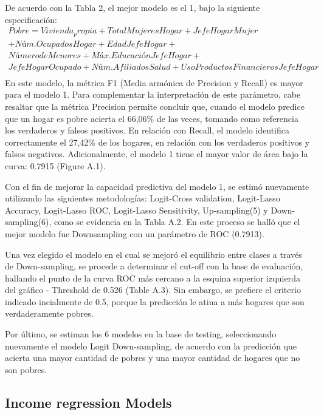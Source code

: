\documentclass[11pt]{article}
\begin{document}
\justify
De acuerdo con la Tabla 2, el mejor modelo es el 1, bajo la siguiente especificación:
 \begin{equation}
   \begin{split} 
 Pobre = Vivienda_propia + Total Mujeres Hogar + Jefe Hogar Mujer \\
 + Núm. Ocupados Hogar+  Edad Jefe Hogar + \\
        Número de Menores + Máx. Educación Jefe Hogar + \\
        Jefe Hogar Ocupado + Núm. Afiliados Salud + Uso Productos Financieros Jefe Hogar \\
\label{eqn:kfold} \end{split} \end{equation}
\justify
En este modelo, la métrica F1 (Media armónica de Precision y Recall) es mayor para el modelo 1. Para complementar la interpretación de este parámetro, cabe resaltar que la métrica Precision permite concluir que, cuando el modelo predice que un hogar es pobre acierta el 66,06\% de las veces, tomando como referencia los verdaderos y falsos positivos. En relación con Recall, el modelo identifica correctamente el 27,42\% de los hogares, en relación con los verdaderos positivos y falsos negativos. Adicionalmente, el modelo 1 tiene el mayor valor de área bajo la curva: 0.7915 (Figure A.1).

\justify
Con el fin de mejorar la capacidad predictiva del modelo 1, se estimó nuevamente utilizando las siguientes metodologías: Logit-Cross validation, Logit-Lasso Accuracy, Logit-Lasso ROC, Logit-Lasso Sensitivity, Up-sampling(5) y Down-sampling(6), como se evidencia en la Tabla A.2. En este proceso se halló que el mejor modelo fue Downsampling con un parámetro de ROC (0.7913). 

\justify
Una vez elegido el modelo en el cual se mejoró el equilibrio entre clases a través de Down-sampling, se procede a determinar el cut-off con la base de evaluación, hallando el punto de la curva ROC más cercano a la esquina superior izquierda del gráfico - Threshold de 0.526 (Table A.3). Sin embargo, se prefiere el criterio indicado incialmente de 0.5, porque la predicción le atina a más hogares que son verdaderamente pobres.

\justify
Por último, se estiman los 6 modelos en la base de testing, seleccionando nuevamente el modelo Logit Down-sampling, de acuerdo con la predicción que acierta una mayor cantidad de pobres y una mayor cantidad de hogares que no son pobres.  


\subsection{Income regression Models}
\end{document}
